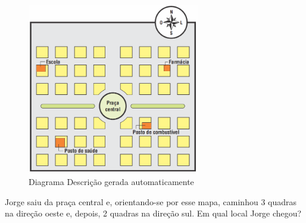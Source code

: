 \begin{escolha}
\begin{boxmedio}
\begin{boxmedio}
{\begin{boxpeq}
\begin{boxpeq}
{\begin{boxpeq}
\begin{boxmedio}
\begin{boxmedio}
\begin{boxpeq}
\begin{boxmedio}
\begin{boxpeq}
\begin{boxpeq}
\begin{boxpeq}
\begin{boxpeq}
\begin{boxmedio}
{\begin{boxmedio}
\begin{boxmedio}
\begin{boxpeq}
\begin{boxmedio}
\begin{boxpeq}
\begin{boxpeq}
\begin{boxpeq}
\begin{escolha}
{\begin{boxmedio}
\begin{boxpeq}
\begin{boxpeq}
\begin{boxpeq}
\begin{boxpeq}
\begin{boxpeq}
\begin{boxmedio}
\begin{boxpeq}
\begin{boxpeq}
\begin{boxpeq}
{\begin{boxpeq}
\begin{boxmedio}
\begin{boxpeq}
\begin{boxpeq}
\begin{boxpeq}
{\begin{boxpeq}
\begin{boxmedio}
{\begin{boxpeq}
\begin{boxpeq}
\begin{boxmedio}
\begin{boxmedio}
\begin{boxpeq}
\begin{boxpeq}
{\begin{boxpeq}
\begin{boxpeq}
\begin{boxpeq}
\begin{boxpeq}
\begin{boxpeq}
\begin{escolha}
\begin{escolha}
{\begin{boxmedio}
\begin{boxpeq}
\begin{q°}
\begin{boxmedio}
\begin{boxpeq}
\begin{boxpeq}
\begin{boxmedio}
\begin{boxmedio}
\begin{boxmedio}
\begin{figure}
\centering
\includegraphics[width=2.96528in,height=2.96528in]{./_SAEB_9_MAT/media/image207.png}
\caption{Diagrama Descrição gerada automaticamente}
\end{figure}


Jorge saiu da praça central e, orientando-se por esse mapa, caminhou 3
quadras na direção oeste e, depois, 2 quadras na direção sul. Em qual
local Jorge chegou?

\end{boxmedio}
\end{boxmedio}
\end{boxmedio}
\end{boxpeq}
\end{boxpeq}
\end{boxmedio}
\end{q°}
\end{boxpeq}
\end{boxmedio}}
\end{escolha}
\end{escolha}
\end{boxpeq}
\end{boxpeq}
\end{boxpeq}
\end{boxpeq}
\end{boxpeq}}
\end{boxpeq}
\end{boxpeq}
\end{boxmedio}
\end{boxmedio}
\end{boxpeq}
\end{boxpeq}}
\end{boxmedio}
\end{boxpeq}}
\end{boxpeq}
\end{boxpeq}
\end{boxpeq}
\end{boxmedio}
\end{boxpeq}}
\end{boxpeq}
\end{boxpeq}
\end{boxpeq}
\end{boxmedio}
\end{boxpeq}
\end{boxpeq}
\end{boxpeq}
\end{boxpeq}
\end{boxpeq}
\end{boxmedio}}
\end{escolha}
\end{boxpeq}
\end{boxpeq}
\end{boxpeq}
\end{boxmedio}
\end{boxpeq}
\end{boxmedio}
\end{boxmedio}}
\end{boxmedio}
\end{boxpeq}
\end{boxpeq}
\end{boxpeq}
\end{boxpeq}
\end{boxmedio}
\end{boxpeq}
\end{boxmedio}
\end{boxmedio}
\end{boxpeq}}
\end{boxpeq}
\end{boxpeq}}
\end{boxmedio}
\end{boxmedio}
\end{escolha}

